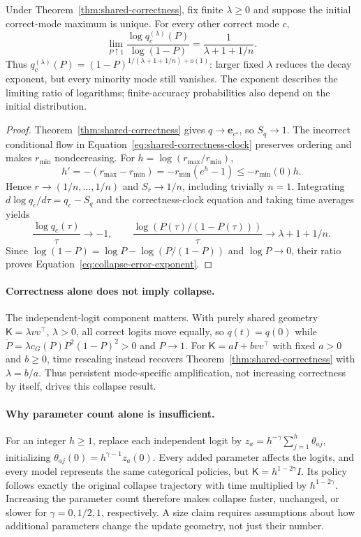 \begin{corollary}
\label{cor:collapse-error-rate}
Under Theorem~\ref{thm:shared-correctness}, fix finite $\lambda\ge0$
and suppose the initial correct-mode maximum is unique. For every other
correct mode $c$,
\begin{equation}
 \lim_{P\uparrow1}\frac{\log q_c^{(\lambda)}(P)}{\log(1-P)}
 =\frac{1}{\lambda+1+1/n}.
 \label{eq:collapse-error-exponent}
\end{equation}
Thus $q_c^{(\lambda)}(P)=(1-P)^{1/(\lambda+1+1/n)+o(1)}$:
larger fixed $\lambda$ reduces the decay exponent, but every minority mode
still vanishes. The exponent describes the limiting ratio of logarithms;
finite-accuracy probabilities also depend on the initial distribution.
\end{corollary}

\begin{proof}
Theorem~\ref{thm:shared-correctness} gives $q\to\mathbf e_{c^\star}$,
so $S_q\to1$. The incorrect conditional flow in
Equation~\eqref{eq:shared-correctness-clock} preserves ordering and makes
$r_{\min}$ nondecreasing. For $h=\log(r_{\max}/r_{\min})$,
\[
 h'=-(r_{\max}-r_{\min})
 =-r_{\min}(e^h-1)\le-r_{\min}(0)h.
\]
Hence $r\to(1/n,\ldots,1/n)$ and $S_r\to1/n$, including trivially $n=1$.
Integrating $d\log q_c/d\tau=q_c-S_q$ and the correctness-clock equation
and taking time averages yields
\[
 \frac{\log q_c(\tau)}{\tau}\to-1,
 \qquad
 \frac{\log(P(\tau)/(1-P(\tau)))}{\tau}
 \to\lambda+1+1/n.
\]
Since $\log(1-P)=\log P-\log(P/(1-P))$ and $\log P\to0$, their ratio proves
Equation~\eqref{eq:collapse-error-exponent}.
\end{proof}

\paragraph{Correctness alone does not imply collapse.}
The independent-logit component matters. With purely shared geometry
$\mathsf K=\lambda vv^\top$, $\lambda>0$, all correct logits move equally,
so $q(t)=q(0)$ while
$\dot P=\lambda c_G(P)P^2(1-P)^2>0$ and $P\to1$.
For $\mathsf K=aI+bvv^\top$ with fixed $a>0$ and $b\ge0$, time rescaling
instead recovers Theorem~\ref{thm:shared-correctness} with $\lambda=b/a$.
Thus persistent mode-specific amplification, not increasing correctness by
itself, drives this collapse result.

\paragraph{Why parameter count alone is insufficient.}
For an integer $h\ge1$, replace each independent logit by
$z_a=h^{-\gamma}\sum_{j=1}^h\theta_{aj}$, initializing
$\theta_{aj}(0)=h^{\gamma-1}z_a(0)$. Every added parameter affects the logits,
and every model represents the same categorical policies, but
$\mathsf K=h^{1-2\gamma}I$. Its policy follows exactly the original collapse
trajectory with time multiplied by $h^{1-2\gamma}$. Increasing the parameter
count therefore makes collapse faster, unchanged, or slower for
$\gamma=0,1/2,1$, respectively. A size claim requires assumptions about how
additional parameters change the update geometry, not just their number.

